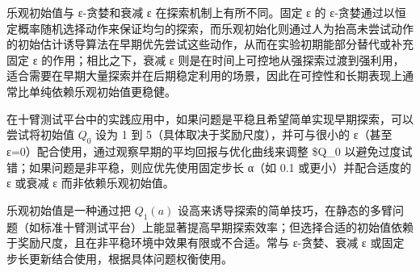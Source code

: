 \documentclass[11pt]{ctexart}
\begin{document}
乐观初始值与 ε-贪婪和衰减 ε 在探索机制上有所不同。固定 ε 的
ε-贪婪通过以恒定概率随机选择动作来保证均匀的探索，而乐观初始化则通过人为抬高未尝试动作的初始估计诱导算法在早期优先尝试这些动作，从而在实验初期能部分替代或补充固定
ε 的作用；相比之下，衰减 ε
则是在时间上可控地从强探索过渡到强利用，适合需要在早期大量探索并在后期稳定利用的场景，因此在可控性和长期表现上通常比单纯依赖乐观初始值更稳健。

在十臂测试平台中的实践应用中，如果问题是平稳且希望简单实现早期探索，可以尝试将初始值
\(Q_0\) 设为 1 到 5（具体取决于奖励尺度），并可与很小的 ε（甚至
ε=0）配合使用，通过观察早期的平均回报与优化曲线来调整 \$Q\_\(0\)
以避免过度试错；如果问题是非平稳，则应优先使用固定步长 α（如 0.1
或更小）并配合适度的 ε 或衰减 ε 而非依赖乐观初始值。

乐观初始值是一种通过把 \(Q_1(a)\)
设高来诱导探索的简单技巧，在静态的多臂问题（如标准十臂测试平台）上能显著提高早期探索效率；但选择合适的初始值依赖于奖励尺度，且在非平稳环境中效果有限或不合适。常与
ε-贪婪、衰减 ε 或固定步长更新结合使用，根据具体问题权衡使用。
\end{document}
